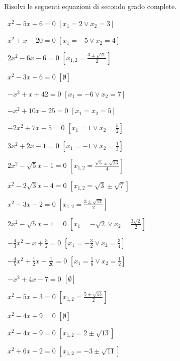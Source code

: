 
\begin{esercizio}[\Ast]
 \label{ese:3.12}
Risolvi le seguenti equazioni di secondo grado complete.
\begin{multicols}{2}
 \begin{enumeratea}
 \item~$x^{2}-5 x + 6=0$
  \hfill$\left[x_{1} = 2 \vee x_{2} = 3\right]$
 \item~$x^{2} + x-20=0$
  \hfill$\left[x_{1} =-5 \vee x_{2} = 4\right]$
 \item~$2 x^{2}-6 x-6=0$
  \hfill$\left[x_{1,2} = \frac{3 \pm \sqrt{21}}{2}\right]$
 \item~$x^{2}-3 x + 6=0$
  \hfill$\left[\emptyset\right]$
 \item~$- x^{2} + x + 42=0$
  \hfill$\left[x_{1} =-6 \vee x_{2} = 7\right]$
 \item~$- x^{2} + 10 x-25=0$
  \hfill$\left[x_{1} = x_{2} = 5\right]$
 \item~$- 2 x^{2} + 7 x-5=0$
  \hfill$\left[x_{1} = 1 \vee x_{2} = \frac{5}{2}\right]$
 \item~$3 x^{2} + 2 x-1=0$
  \hfill$\left[x_{1} =-1 \vee x_{2} = \frac{1}{3}\right]$
 \item~$2 x^{2}-\sqrt{5} x-1 = 0$
  \hfill$\left[x_{1,2} = \frac{\sqrt{5} \pm \sqrt{13}}{4}\right]$
 \item~$x^{2}-2 \sqrt{3} x-4=0$
  \hfill$\left[x_{1,2} = \sqrt{3} \pm \sqrt{7}\right]$
 \item~$x^{2}-3 x-2=0$
  \hfill$\left[x_{1,2} = \frac{3 \pm \sqrt{17}}{2}\right]$
 \item~$2 x^{2}-\sqrt{5} x-1=0$
  \hfill$\left[x_{1} =-\sqrt{2} \vee x_{2} = \frac{3 \sqrt{2}}{2}\right]$
 \item~$- \frac{4}{3} x^{2}-x + \frac{3}{2}=0$
  \hfill$\left[x_{1} =-\frac{3}{2} \vee x_{2} = \frac{3}{4}\right]$
 \item~$- \frac{4}{5} x^{2} + \frac{1}{2} x-\frac{1}{20}=0$
  \hfill$\left[x_{1} = \frac{1}{8} \vee x_{2} = \frac{1}{2}\right]$
 \item~$- x^{2} + 4 x-7=0$
  \hfill$\left[\emptyset\right]$
 \item~$x^{2}-5 x + 3 = 0$
  \hfill$\left[x_{1,2} = \frac{5 \pm \sqrt{13}}{2}\right]$
 \item~$x^{2}-4 x + 9 = 0$
  \hfill$\left[\emptyset\right]$
 \item~$x^{2}-4 x-9 = 0$
  \hfill$\left[x_{1,2} = 2 \pm \sqrt{13}\right]$
 \item~$x^{2} + 6 x-2 = 0$
  \hfill$\left[x_{1,2} =-3 \pm \sqrt{11}\right]$
 \end{enumeratea}
 \end{multicols}
\end{esercizio}

